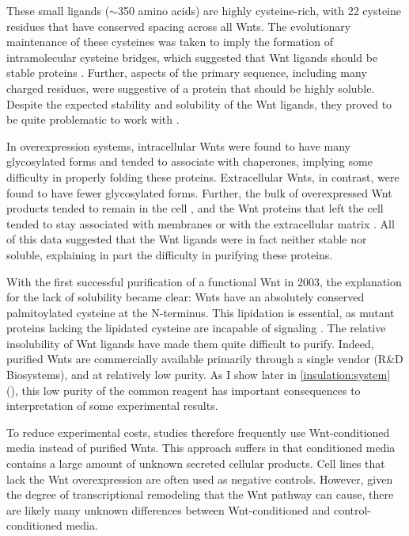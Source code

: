 These small ligands ($\sim$350 amino acids) are highly cysteine-rich,
with 22 cysteine residues that have
conserved spacing across all Wnts. The evolutionary maintenance of these cysteines
was taken to imply the formation of intramolecular cysteine bridges, which suggested
that Wnt ligands should be stable proteins \cite{Mason1992}.
Further, aspects of the primary sequence, including many
charged residues, were suggestive of a protein that should be highly soluble.
Despite the expected stability and solubility of the Wnt ligands, they proved
to be quite problematic to work with \cite{Verheyen2010}.


In overexpression systems, intracellular Wnts were found to have many glycosylated forms and
tended to associate with chaperones, implying some difficulty in properly folding 
these proteins. Extracellular Wnts, in contrast, were found to have fewer glycosylated forms.
Further, the bulk of overexpressed Wnt products tended to remain in the cell \cite{Mikels2006},
and the Wnt proteins that left the cell tended to stay associated with membranes or with the
extracellular matrix \cite{Reichsman1996}. All of this data suggested that the Wnt
ligands were in fact neither stable nor soluble, explaining in part
the difficulty in purifying these proteins.


With the first successful purification of a functional Wnt in
2003, the explanation for the lack of solubility became clear: Wnts have an absolutely
conserved palmitoylated cysteine at the N-terminus. This lipidation is essential, as
mutant proteins lacking the lipidated cysteine
are incapable of signaling \cite{Willert2003}.
The relative insolubility of Wnt ligands have made them quite difficult to purify.
Indeed, purified Wnts are commercially available primarily through a single vendor
(R\&D Biosystems), and at
relatively low purity. As I show later in \autoref{insulation:system}
(), this
low purity of the common reagent has important consequences to interpretation of
some experimental results.


To reduce experimental costs, studies therefore
frequently use Wnt-conditioned media instead of purified Wnts.
This approach suffers in that conditioned media contains a large amount of
unknown secreted cellular products. Cell lines that lack the Wnt
overexpression are often used as negative controls. However, given the degree of
transcriptional remodeling that the Wnt pathway can cause, there are likely
many unknown differences between Wnt-conditioned and control-conditioned
media.


